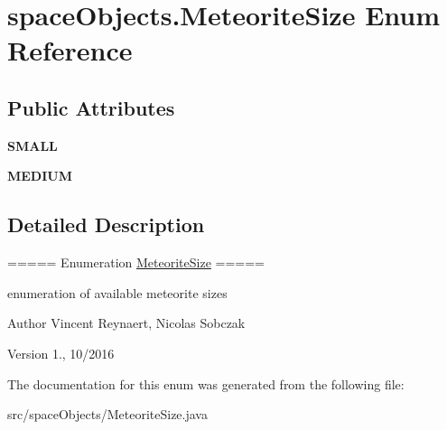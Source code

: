 \hypertarget{enumspace_objects_1_1_meteorite_size}{}\section{space\+Objects.\+Meteorite\+Size Enum Reference}
\label{enumspace_objects_1_1_meteorite_size}
\subsection*{Public Attributes}
\begin{DoxyCompactItemize}
\item 
{\bfseries S\+M\+A\+LL}\hypertarget{enumspace_objects_1_1_meteorite_size_aa13610df706f2dc736c32a5159e3f7fd}{}\label{enumspace_objects_1_1_meteorite_size_aa13610df706f2dc736c32a5159e3f7fd}

\item 
{\bfseries M\+E\+D\+I\+UM}\hypertarget{enumspace_objects_1_1_meteorite_size_ae9d062e0a8f971cfe5967220562c5d71}{}\label{enumspace_objects_1_1_meteorite_size_ae9d062e0a8f971cfe5967220562c5d71}

\end{DoxyCompactItemize}


\subsection{Detailed Description}
===== Enumeration \hyperlink{enumspace_objects_1_1_meteorite_size}{Meteorite\+Size} =====

enumeration of available meteorite sizes

\begin{DoxyAuthor}{Author}
Vincent Reynaert, Nicolas Sobczak 
\end{DoxyAuthor}
\begin{DoxyVersion}{Version}
1., 10/2016 
\end{DoxyVersion}


The documentation for this enum was generated from the following file\+:\begin{DoxyCompactItemize}
\item 
src/space\+Objects/Meteorite\+Size.\+java\end{DoxyCompactItemize}
